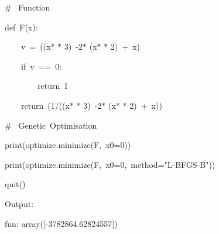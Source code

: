 \documentclass[12pt]{article}
\renewcommand{\_}{\kern-1.5pt\textunderscore\kern-1.5pt}
\begin{document}
\vspace{\baselineskip}
{\fontsize{10pt}{12.0pt}\selectfont \textcolor[HTML]{6A9955}{$\#$  Function}\par}\par

{\fontsize{10pt}{12.0pt}\selectfont \textcolor[HTML]{569CD6}{def F(x):}\par}\par

{\fontsize{10pt}{12.0pt}\selectfont \textcolor[HTML]{D4D4D4}{    v = ((x$\ast$ $\ast$ 3) -2$\ast$ (x$\ast$ $\ast$ 2) + x)}\par}\par

{\fontsize{10pt}{12.0pt}\selectfont \textcolor[HTML]{D4D4D4}{    if v == 0:}\par}\par

{\fontsize{10pt}{12.0pt}\selectfont \textcolor[HTML]{D4D4D4}{        return 1}\par}\par

{\fontsize{10pt}{12.0pt}\selectfont \textcolor[HTML]{D4D4D4}{    return (1/((x$\ast$ $\ast$ 3) -2$\ast$ (x$\ast$ $\ast$ 2) + x))}\par}\par


\vspace{\baselineskip}
{\fontsize{10pt}{12.0pt}\selectfont \textcolor[HTML]{6A9955}{$\#$  Genetic Optimisation}\par}\par

{\fontsize{10pt}{12.0pt}\selectfont \textcolor[HTML]{DCDCAA}{print(optimize.minimize(F, x0=0))}\par}\par

{\fontsize{10pt}{12.0pt}\selectfont \textcolor[HTML]{DCDCAA}{print(optimize.minimize(F, x0=0, method="L-BFGS-B"))}\par}\par

{\fontsize{10pt}{12.0pt}\selectfont \textcolor[HTML]{DCDCAA}{quit()}\par}\par


\vspace{\baselineskip}
{\fontsize{14pt}{16.8pt}\selectfont Output:\par}\par

{\fontsize{10pt}{12.0pt}\selectfont fun: array([-3782864.62824557])\par}\par
\end{document}
